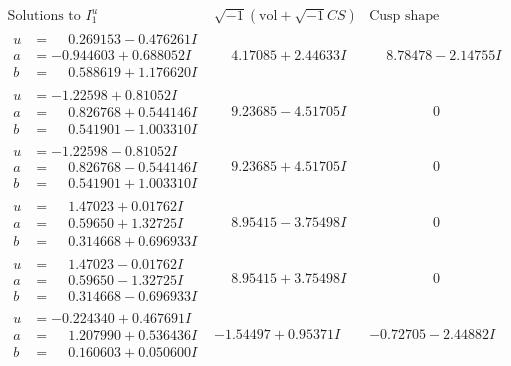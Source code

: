\documentclass[1p]{elsarticle_modified}
\theoremstyle{definition}
\newcommand{\I}{\sqrt{-1}}
\begin{document}
$$\begin{array}{c|c|c}
\text{Solutions to }I^u_{1}& \I (\text{vol} + \sqrt{-1}CS) & \text{Cusp shape}\\
 \hline 
\begin{aligned}
u &= \phantom{-}0.269153 - 0.476261 I \\
a &= -0.944603 + 0.688052 I \\
b &= \phantom{-}0.588619 + 1.176620 I\end{aligned}
 & \phantom{-}4.17085 + 2.44633 I & \phantom{-}8.78478 - 2.14755 I \\ \hline\begin{aligned}
u &= -1.22598 + 0.81052 I \\
a &= \phantom{-}0.826768 + 0.544146 I \\
b &= \phantom{-}0.541901 - 1.003310 I\end{aligned}
 & \phantom{-}9.23685 - 4.51705 I & \phantom{-0.000000 } 0 \\ \hline\begin{aligned}
u &= -1.22598 - 0.81052 I \\
a &= \phantom{-}0.826768 - 0.544146 I \\
b &= \phantom{-}0.541901 + 1.003310 I\end{aligned}
 & \phantom{-}9.23685 + 4.51705 I & \phantom{-0.000000 } 0 \\ \hline\begin{aligned}
u &= \phantom{-}1.47023 + 0.01762 I \\
a &= \phantom{-}0.59650 + 1.32725 I \\
b &= \phantom{-}0.314668 + 0.696933 I\end{aligned}
 & \phantom{-}8.95415 - 3.75498 I & \phantom{-0.000000 } 0 \\ \hline\begin{aligned}
u &= \phantom{-}1.47023 - 0.01762 I \\
a &= \phantom{-}0.59650 - 1.32725 I \\
b &= \phantom{-}0.314668 - 0.696933 I\end{aligned}
 & \phantom{-}8.95415 + 3.75498 I & \phantom{-0.000000 } 0 \\ \hline\begin{aligned}
u &= -0.224340 + 0.467691 I \\
a &= \phantom{-}1.207990 + 0.536436 I \\
b &= \phantom{-}0.160603 + 0.050600 I\end{aligned}
 & -1.54497 + 0.95371 I & -0.72705 - 2.44882 I \\ \hline\begin{aligned}

\end{aligned}
\end{array}$$
\end{document}
